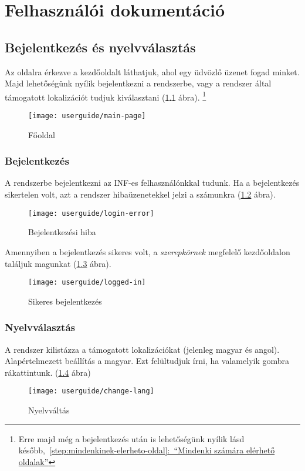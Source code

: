 \chapter{Felhasználói dokumentáció} %
\label{ch:user}

\section{Bejelentkezés és nyelvválasztás}
Az oldalra érkezve a kezdőoldalt láthatjuk, ahol egy üdvözlő üzenet fogad minket. Majd lehetőségünk nyílik bejelentkezni a rendszerbe, vagy a rendszer által támogatott lokalizációt tudjuk kiválasztani (\ref{fig:main-page} ábra). \footnote{Erre majd még a bejelentkezés után is lehetőségünk nyílik lásd később,~\hyperref[step:mindenkinek-elerheto-oldal]{\ref{step:mindenkinek-elerheto-oldal}:~``Mindenki számára elérhető oldalak''}}
\begin{figure}[H]
	\centering
	\texttt{[image: userguide/main-page]}
	\caption{Főoldal}
	\label{fig:main-page}
\end{figure}
\subsection{Bejelentkezés}
A rendszerbe bejelentkezni az INF-es felhasználónkkal tudunk. Ha a bejelentkezés sikertelen volt, azt a rendszer hibaüzenetekkel jelzi a számunkra (\ref{fig:login-error} ábra). 
\begin{figure}[H]
	\centering
	\texttt{[image: userguide/login-error]}
	\caption{Bejelentkezési hiba}
	\label{fig:login-error}
\end{figure}
Amennyiben a bejelentkezés sikeres volt, a \emph{szerepkörnek} megfelelő kezdőoldalon találjuk magunkat (\ref{fig:logged-in} ábra).
\begin{figure}[H]
	\centering
	\texttt{[image: userguide/logged-in]}
	\caption{Sikeres bejelentkezés}
	\label{fig:logged-in}
\end{figure}
\subsection{Nyelvválasztás}
A rendszer kilistázza a támogatott lokalizációkat (jelenleg magyar és angol). Alapértelmezett beállítás a magyar. Ezt felültudjuk írni, ha valamelyik gombra rákattintunk. (\ref{fig:change-lang} ábra)
\begin{figure}[H]
	\centering
	\texttt{[image: userguide/change-lang]}
	\caption{Nyelvváltás}
	\label{fig:change-lang}
\end{figure}
